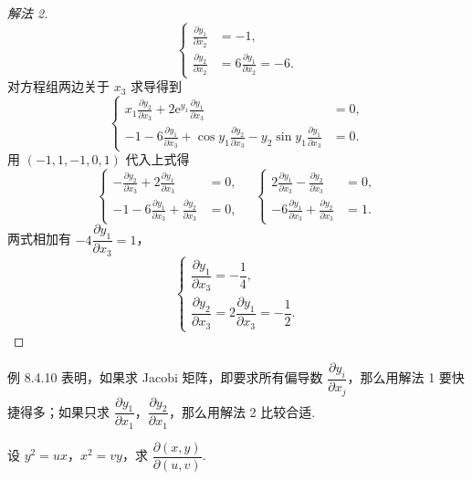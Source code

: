 \begin{proof}[解法 2]
\[
  \left\{\begin{aligned}
    \frac{\partial y_{1}}{\partial x_{2}} &= -1, \\
    \frac{\partial y_{2}}{\partial x_{2}} &= 6\frac{\partial y_{1}}{\partial x_{2}} = -6.
  \end{aligned}\right.
\]
对方程组两边关于 $x_{3}$ 求导得到
\[
  \left\{\begin{aligned}
    x_{1}\frac{\partial y_{2}}{\partial x_{3}} + 2\mathrm{e}^{y_{1}}\frac{\partial y_{1}}{\partial x_{3}} &= 0, \\
    -1 - 6\frac{\partial y_{1}}{\partial x_{3}} + \cos y_{1}\frac{\partial y_{2}}{\partial x_{3}} - y_{2}\sin y_{1}\frac{\partial y_{1}}{\partial x_{3}} &= 0.
  \end{aligned}\right.
\]
用 $(-1,1,-1,0,1)$ 代入上式得
\[
  \left\{\begin{aligned}
    -\frac{\partial y_{2}}{\partial x_{3}} + 2\frac{\partial y_{1}}{\partial x_{3}} &= 0, \\[4pt]
    -1 - 6\frac{\partial y_{1}}{\partial x_{3}} + \frac{\partial y_{2}}{\partial x_{3}} &= 0,
  \end{aligned}\right.
  \quad
  \left\{\begin{aligned}
    2\frac{\partial y_{1}}{\partial x_{3}} - \frac{\partial y_{2}}{\partial x_{3}} &= 0, \\[4pt]
    -6\frac{\partial y_{1}}{\partial x_{3}} + \frac{\partial y_{2}}{\partial x_{3}} &= 1.
  \end{aligned}\right.
\]
两式相加有 $-4\dfrac{\partial y_{1}}{\partial x_{3}} = 1$，
\[
  \begin{cases}
    \dfrac{\partial y_{1}}{\partial x_{3}} = -\dfrac{1}{4}, \\[6pt]
    \dfrac{\partial y_{2}}{\partial x_{3}} = 2\dfrac{\partial y_{1}}{\partial x_{3}} = -\dfrac{1}{2}.
  \end{cases}
\]
\end{proof}

\begin{remark}\label{rem:8.4.3}
例 8.4.10 表明，如果求 Jacobi 矩阵，即要求所有偏导数 $\dfrac{\partial y_{i}}{\partial x_{j}}$，那么用解法 1 要快捷得多；如果只求 $\dfrac{\partial y_{1}}{\partial x_{1}}$，$\dfrac{\partial y_{2}}{\partial x_{1}}$，那么用解法 2 比较合适.
\end{remark}

\begin{example}\label{ex:8.4.11}
设 $y^{2} = ux$，$x^{2} = vy$，求 $\dfrac{\partial(x,y)}{\partial(u,v)}$.
\end{example}

